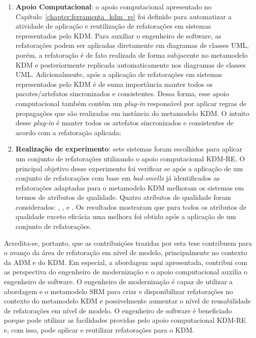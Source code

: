 \begin{enumerate}
\item \textbf{Apoio Computacional}: o apoio computacional apresentado no Capítulo~\ref{chapter:ferramenta_kdm_re} foi definido para automatizar a atividade de aplicação e reutilização de refatorações em sistemas representados pelo KDM. Para auxiliar o engenheiro de software, as refatorações podem ser aplicadas diretamente em diagramas de classes UML, porém, a refatoração é de fato realizada de forma subjacente no metamodelo KDM e posteriormente replicada automaticamente nos diagramas de classes UML. Adicionalmente, após a aplicação de refatorações em sistemas representados pelo KDM é de suma importância manter todos os pacotes/artefatos sincronizados e consistentes. Dessa forma, esse apoio computacional também contém um \textit{plug-in} responsável por aplicar regras de propagações que são realizadas em instância do metamodelo KDM. O intuito desse \textit{plug-in} é manter todos os artefatos sincronizados e consistentes de acordo com a refatoração aplicada;

\item \textbf{Realização de experimento}: sete sistemas foram escolhidos para aplicar um conjunto de refatorações utilizando o apoio computacional KDM-RE. O principal objetivo desse experimento foi verificar se após a aplicação de um conjunto de refatorações com base em \textit{bad-smells} já identificados as refatorações adaptadas para o metamodelo KDM melhoram os sistemas em termos de atributos de qualidade. Quatro atributos de qualidade foram considerados: , ,  e . Os resultados mostraram que para todos os atributos de qualidade exceto eficácia uma melhora foi obtido após a aplicação de um conjunto de refatorações.

\end{enumerate}

Acredita-se, portanto, que as contribuições trazidas por esta tese contribuem para o avanço da área de refatoração em nível de modelo, principalmente no contexto da ADM e do KDM. Em especial, a abordagem aqui apresentada, contribui com as perspectiva do engenheiro de modernização e o apoio computacional auxilia o engenheiro de software. O engenheiro de modernização é capaz de utilizar a abordagem e o metamodelo SRM para criar e disponibilizar refatorações no contexto do metamodelo KDM e possivelmente aumentar o nível de reusabilidade de refatorações em nível de modelo. O engenheiro de software é beneficiado porque pode utilizar as facilidades providas pelo apoio computacional KDM-RE e, com isso, pode aplicar e reutilizar refatorações para o KDM.


